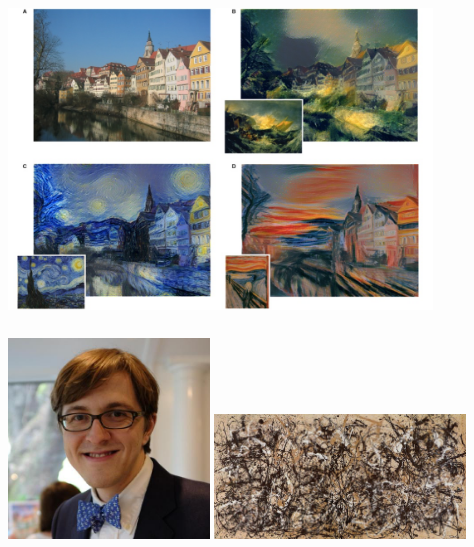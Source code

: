 \documentclass[xetex,mathserif,serif,aspectratio=169]{beamer}
\begin{document}
\begin{frame}[fragile] \frametitle{} \oldB \small

\begin{center}
\includegraphics[height=8cm]{img/styleTransfer.jpg}
\end{center}

\end{frame}

\begin{frame}[fragile] \frametitle{} \oldB \small

\includegraphics[width=0.4\textwidth]{img/me.png}
\includegraphics[width=0.5\textwidth]{img/pollock.jpg}

\end{frame}
\end{document}
